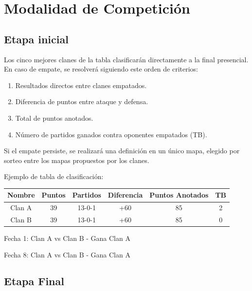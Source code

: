 \documentclass[a4paper, 11pt]{article}
\begin{document}
    \clearpage

    \section{Modalidad de Competición}

    \subsection{Etapa inicial}

    Los cinco mejores clanes de la tabla clasificarán directamente a la final presencial.
    En caso de empate, se resolverá siguiendo este orden de criterios:

    \begin{enumerate}
        \item  Resultados directos entre clanes empatados.
        \item  Diferencia de puntos entre ataque y defensa.
        \item  Total de puntos anotados.
        \item  Número de partidos ganados contra oponentes empatados (TB).
    \end{enumerate}
   
    Si el empate persiste, se realizará una definición en un único mapa, elegido por sorteo entre los mapas propuestos por los clanes.\par
    Ejemplo de tabla de clasificación:

    \begin{center}
        \begin{tabular}{||c c c c c c||} 
         \hline
         Nombre & Puntos & Partidos & Diferencia & Puntos Anotados & TB\\ [0.5ex] 
         \hline\hline
         Clan A & 39 & 13-0-1 & +60 & 85 & 2 \\ 
         \hline
         Clan B & 39 & 13-0-1 & +60 & 85 & 0 \\
         \hline
        \end{tabular}
    \end{center}

    Fecha 1: Clan A vs Clan B - Gana Clan A \par
    Fecha 8: Clan A vs Clan B - Gana Clan A

    \subsection{Etapa Final}
\end{document}
